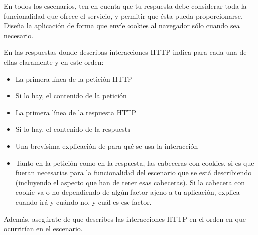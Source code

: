 En todos los escenarios, ten en cuenta que tu respuesta debe considerar toda la funcionalidad que ofrece el servicio, y permitir que ésta pueda proporcionarse. Diseña la aplicación de forma que envíe cookies al navegador sólo cuando sea necesario.

En las respuestas donde describas interacciones HTTP indica para cada una de ellas claramente y en este orden:
  \begin{itemize}
  \item La primera línea de la petición HTTP
  \item Si lo hay, el contenido de la petición
  \item La primera línea de la respuesta HTTP
  \item Si lo hay, el contenido de la respuesta
  \item Una brevísima explicación de para qué se usa la interacción
  \item Tanto en la petición como en la respuesta, las cabeceras con cookies, si es que fueran necesarias para la funcionalidad del escenario que se está describiendo (incluyendo el aspecto que han de tener esas cabeceras). Si la cabecera con cookie va o no dependiendo de algún factor ajeno a tu aplicación, explica cuando irá y cuándo no, y cuál es ese factor.
  \end{itemize}

Además, asegúrate de que describes las interacciones HTTP en el orden en que ocurrirían en el escenario.

